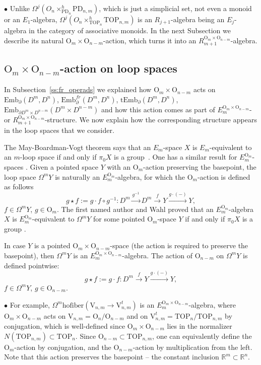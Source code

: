 \documentclass[11pt]{amsart}
\theoremstyle{definition}
\newcommand{\R}{{\mathbb R}}
\newcommand{\Embmn}{\mathrm{Emb}_\partial(D^m,D^n)}
\newcommand{\Embfrmn}{\mathrm{Emb}_\partial^{fr}(D^m,D^n)}
\newcommand{\tEmbmn}{\mathrm{tEmb}_\partial(D^m,D^n)}
\newcommand{\Emb}{\mathrm{Emb}}
\newcommand{\TOP}{\mathrm{TOP}}
\newcommand{\OO}{\mathrm{O}}
\newcommand{\PD}{\mathrm{PD}}
\newcommand{\VV}{\mathrm{V}}
\newcommand{\hofiber}{\mathrm{hofiber}}
\numberwithin{equation}{section}
\begin{document}
$\bullet$ Unlike $\Omega^j\left(O_n\times_{\PD_n}^h \PD_{n,m}\right)$, which is just a simplicial set, not even a monoid or an $E_1$-algebra,
$\Omega^j\left(O_n\times_{\TOP_n}^h \TOP_{n,m}\right)$ is an $R_{j+1}$-algebra being an $E_j$-algebra in the category of associative monoids. 
In the next Subsection we describe its natural $\OO_m\times\OO_{n-m}$-action, which turns it into an $R_{m+1}^{\OO_m\times\OO_{n-m}}$-algebra.


\subsection{$\OO_m\times\OO_{n-m}$-action on loop spaces}\label{ss:O_action_loops}
In Subsection~\ref{ss:fr_operads} we explained how $\OO_m\times\OO_{n-m}$ acts on $\Embmn$, $\Embfrmn$, $\tEmbmn$, 
$\Emb_{\partial D^m\times D^{n-m}}(D^m\times D^{n-m})$ and how this action comes as  part of $E_{m}^{\OO_m\times\OO_{n-m}}$- or $R_{m+1}^{\OO_m\times\OO_{n-m}}$-structure. 
We now explain how the corresponding structure appears in the loop spaces that we consider.

The May-Boardman-Vogt theorem says that an $E_m$-space $X$ is $E_m$-equivalent to an $m$-loop space if and only if $\pi_0 X$ is a group~\cite{BoardVogt,May}.
One has a similar result for $E_m^{\OO_m}$-spaces \cite{SalvWahl}. Given a pointed space $Y$ with an $\OO_m$-action preserving the basepoint, the
loop space $\Omega^mY$ is naturally an $E_m^{\OO_m}$-algebra, for which the $\OO_m$-action is defined as follows
\[
g\star f:=g\cdot f\circ g^{-1}: D^m\xrightarrow{g^{-1}} D^m\xrightarrow{f} Y\xrightarrow{g\cdot(-)} Y,
\]
$f\in\Omega^m Y$, $g\in \OO_m$. The first named author and Wahl proved that an $E_m^{\OO_m}$-algebra $X$ is $E_m^{\OO_m}$-equivalent to $\Omega^m Y$ 
for some pointed $\OO_m$-space $Y$ if and only if $\pi_0X$ is a group \cite{SalvWahl}.

In case $Y$ is a pointed $\OO_m\times\OO_{n-m}$-space (the action is required to preserve the basepoint), then $\Omega^m Y$ is an 
$E_{m}^{\OO_m\times\OO_{n-m}}$-algebra. The action of $\OO_{n-m}$ on $\Omega^m Y$ is defined pointwise:
\[
g\star f:=g\cdot f\colon D^m\xrightarrow{f} Y\xrightarrow{g\cdot(-)} Y,
\]
$f\in\Omega^m Y$, $g\in \OO_{n-m}$.

$\bullet$ For example, $\Omega^m\hofiber(\VV_{n,m}\to \VV_{n,m}^t)$ is an $E_{m}^{\OO_m\times\OO_{n-m}}$-algebra, where $\OO_m\times\OO_{n-m}$
acts on $\VV_{n,m}=\OO_n/\OO_{n-m}$ and on $\VV_{n,m}^t=\TOP_n/\TOP_{n,m}$ by conjugation, which is well-defined since 
$\OO_m\times\OO_{n-m}$ lies in the normalizer $N(\TOP_{n,m})\subset \TOP_n$. Since $\OO_{n-m}\subset\TOP_{n,m}$, one can equivalently define the
$\OO_m$-action by conjugation, and the $\OO_{n-m}$-action by multiplication from the left. Note that this action preserves the basepoint -- the constant inclusion 
$\R^m\subset\R^n$.
\end{document}
